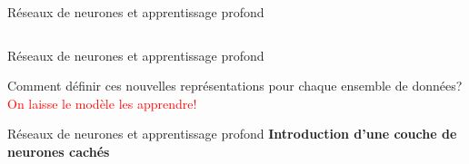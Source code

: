 \documentclass[french]{beamer}
\begin{document}
\begin{frame}{Réseaux de neurones et apprentissage profond}
\begin{columns}[T]
\begin{column}{.3\textwidth}
\begin{center}
\end{center}
\end{column}
\hfill
\end{columns}
\end{frame}


\begin{frame}{Réseaux de neurones et apprentissage profond}
\begin{center}
{\Large Comment définir ces nouvelles représentations pour chaque ensemble de données?} \\
\pause
\vspace{1cm}
{\Large{\textcolor{red}{On laisse le modèle les apprendre!}}}
\end{center}
\end{frame}

\begin{frame}{Réseaux de neurones et apprentissage profond}
\textbf{Introduction d'une couche de neurones cachés}


\end{frame}
\end{document}
